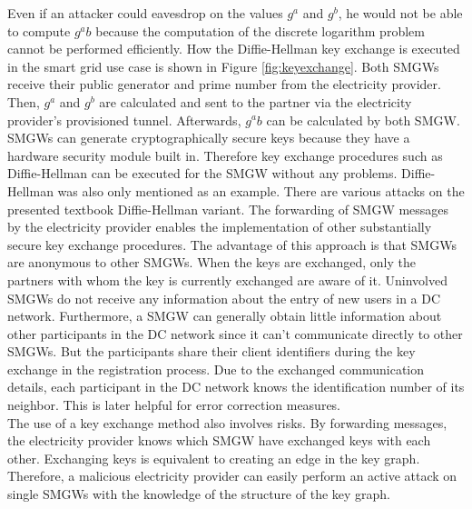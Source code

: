 Even if an attacker could eavesdrop on the values $g^a$ and $g^b$, he would not be able to compute $g^ab$ because the computation of the discrete logarithm problem cannot be performed efficiently. How the Diffie-Hellman key exchange is executed in the smart grid use case is shown in Figure \ref{fig:keyexchange}. 
Both SMGWs receive their public generator and prime number from the electricity provider. Then, $g^a$ and $g^b$ are calculated and sent to the partner via the electricity provider's provisioned tunnel. Afterwards, $g^ab$ can be calculated by both SMGW.\\
SMGWs can generate cryptographically secure keys because they have a hardware security module built in. Therefore key exchange procedures such as Diffie-Hellman can be executed for the SMGW without any problems. Diffie-Hellman was also only mentioned as an example. There are various attacks on the presented textbook Diffie-Hellman variant.
The forwarding of SMGW messages by the electricity provider enables the implementation of other substantially secure key exchange procedures. The advantage of this approach is that SMGWs are anonymous to other SMGWs. When the keys are exchanged, only the partners with whom the key is currently exchanged are aware of it. Uninvolved SMGWs do not receive any information about the entry of new users in a DC network. Furthermore, a SMGW can generally obtain little information about other participants in the DC network since it can't communicate directly to other SMGWs. But the participants share their client identifiers during the key exchange in the registration process. Due to the exchanged communication details, each participant in the DC network knows the identification number of its neighbor. This is later helpful for error correction measures. %
\\The use of a key exchange method also involves risks. By forwarding messages, the electricity provider knows which SMGW have exchanged keys with each other. Exchanging keys is equivalent to creating an edge in the key graph.%
Therefore, a malicious electricity provider can easily perform an active attack on single SMGWs with the knowledge of the structure of the key graph.%
